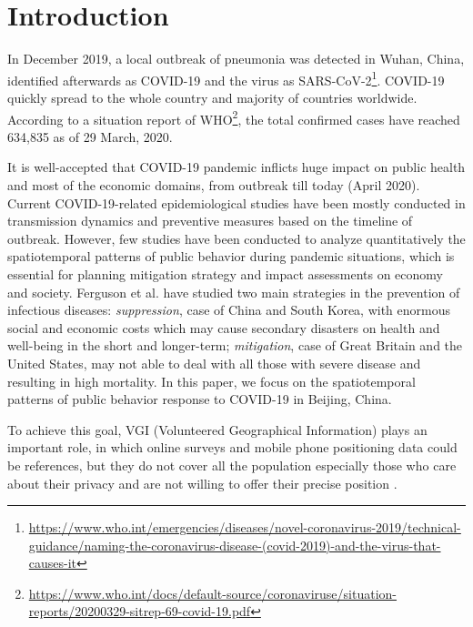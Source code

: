 \documentclass[preprints,ijgi,submit,moreauthors]{Definitions/mdpi}
\begin{document}
\section{Introduction}
In December 2019, a local outbreak of pneumonia was detected in Wuhan, China, identified afterwards as COVID-19 and the virus as SARS-CoV-2\footnote{\url{https://www.who.int/emergencies/diseases/novel-coronavirus-2019/technical-guidance/naming-the-coronavirus-disease-(covid-2019)-and-the-virus-that-causes-it}}.
COVID-19 quickly spread to the whole country and majority of countries worldwide.
According to a situation report of WHO\footnote{\url{https://www.who.int/docs/default-source/coronaviruse/situation-reports/20200329-sitrep-69-covid-19.pdf}}, the total confirmed cases have reached 634,835 as of 29 March, 2020.

It is well-accepted that COVID-19 pandemic inflicts huge impact on public health and most of the economic domains, from outbreak till today (April 2020).
Current COVID-19-related epidemiological studies have been mostly conducted in transmission dynamics \cite{li2020early,pitzer2009demographic} and preventive measures \cite{chinazzi2020effect,van2006today} based on the timeline of outbreak.
However, few studies have been conducted to analyze quantitatively the spatiotemporal patterns of public behavior during pandemic situations, which is essential for planning mitigation strategy and impact assessments on economy and society.
Ferguson et al. \cite{ferguson2020report} have studied two main strategies in the prevention of infectious diseases: \textit{suppression}, case of China and South Korea, with enormous social and economic costs which may cause secondary disasters on health and well-being in the short and longer-term;
\textit{mitigation}, case of Great Britain and the United States, may not able to deal with all those with severe disease and resulting in high mortality.
In this paper, we focus on the spatiotemporal patterns of public behavior response to COVID-19 in Beijing, China.

To achieve this goal, VGI (Volunteered Geographical Information) plays an important role, in which online surveys and mobile phone positioning data could be references, but they do not cover all the population especially those who care about their privacy and are not willing to offer their precise position \cite{Li2016ISPRS}.  
\end{document}
